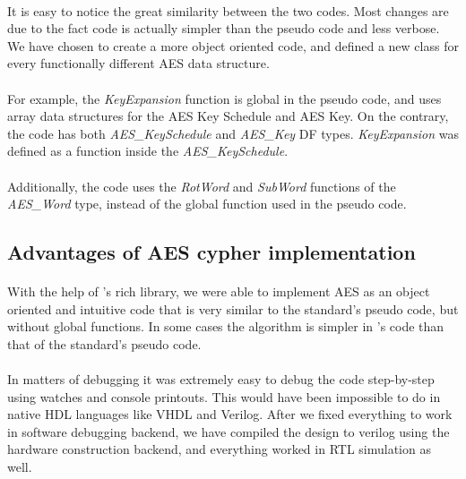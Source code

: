 \paragraph{}It is easy to notice the great similarity between the two codes. Most changes are due to the fact \cf code is actually simpler than the pseudo code and less verbose. We have chosen to create a more object oriented code, and defined a new class for every functionally different AES data structure. 
\paragraph{}For example, the \textit{KeyExpansion} function is global in the pseudo code, and uses array data structures for the AES Key Schedule and AES Key. On the contrary, the \cf code has both \textit{AES\_KeySchedule} and \textit{AES\_Key} DF types. \textit{KeyExpansion} was defined as a function inside the \textit{AES\_KeySchedule}.
\paragraph{}Additionally, the \cf code uses the \textit{RotWord} and \textit{SubWord} functions of the \textit{AES\_Word} type, instead of the global function used in the pseudo code.

\subsection*{Advantages of \cf AES cypher implementation}
\paragraph{}With the help of \cfns's rich library, we were able to implement AES as an object oriented and intuitive code that is very similar to the standard's pseudo code, but without global functions. In some cases the algorithm is simpler in \cfns's code than that of the standard's pseudo code.
\paragraph{}In matters of debugging it was extremely easy to debug the code step-by-step using watches and console printouts. This would have been impossible to do in native HDL languages like VHDL and Verilog. After we fixed everything to work in software debugging backend, we have compiled the design to verilog using the hardware construction backend, and everything worked in RTL simulation as well.
